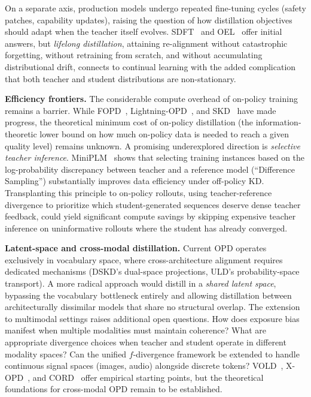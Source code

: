 \documentclass{article} %
\begin{document}
On a separate axis, production models undergo repeated fine-tuning cycles (safety patches, capability updates), raising the question of how distillation objectives should adapt when the teacher itself evolves. SDFT~\citep{2601.19897} and OEL~\citep{2603.16856} offer initial answers, but \emph{lifelong distillation}, attaining re-alignment without catastrophic forgetting, without retraining from scratch, and without accumulating distributional drift, connects to continual learning with the added complication that both teacher and student distributions are non-stationary.

\textbf{Efficiency frontiers.} The considerable compute overhead of on-policy training remains a barrier. While FOPD~\citep{2602.15260}, Lightning-OPD~\citep{2604.13010}, and SKD~\citep{2410.11325} have made progress, the theoretical minimum cost of on-policy distillation (the information-theoretic lower bound on how much on-policy data is needed to reach a given quality level) remains unknown. A promising underexplored direction is \emph{selective teacher inference}. MiniPLM~\citep{2410.17215} shows that selecting training instances based on the log-probability discrepancy between teacher and a reference model (``Difference Sampling'') substantially improves data efficiency under off-policy KD. Transplanting this principle to on-policy rollouts, using teacher-reference divergence to prioritize which student-generated sequences deserve dense teacher feedback, could yield significant compute savings by skipping expensive teacher inference on uninformative rollouts where the student has already converged.

\textbf{Latent-space and cross-modal distillation.} Current OPD operates exclusively in vocabulary space, where cross-architecture alignment requires dedicated mechanisms (DSKD's dual-space projections, ULD's probability-space transport). A more radical approach would distill in a \emph{shared latent space}, bypassing the vocabulary bottleneck entirely and allowing distillation between architecturally dissimilar models that share no structural overlap. The extension to multimodal settings raises additional open questions. How does exposure bias manifest when multiple modalities must maintain coherence? What are appropriate divergence choices when teacher and student operate in different modality spaces? Can the unified $f$-divergence framework be extended to handle continuous signal spaces (images, audio) alongside discrete tokens? VOLD~\citep{2510.23497}, X-OPD~\citep{2603.24596}, and CORD~\citep{2601.16547} offer empirical starting points, but the theoretical foundations for cross-modal OPD remain to be established.
\end{document}
